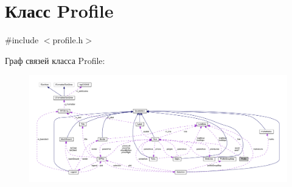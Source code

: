\hypertarget{class_profile}{\section{Класс Profile}
\label{class_profile}
}


{\ttfamily \#include $<$profile.\-h$>$}



Граф связей класса Profile\-:
\nopagebreak
\begin{figure}[H]
\begin{center}
\leavevmode
\includegraphics[width=350pt]{class_profile__coll__graph}
\end{center}
\end{figure}
